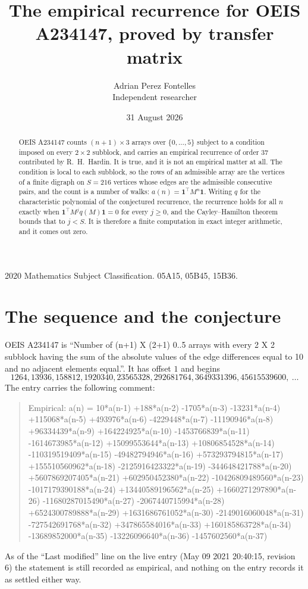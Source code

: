 \documentclass[11pt,a4paper]{article}
\title{The empirical recurrence for OEIS A234147, proved by transfer matrix}
\author{Adrian Perez Fontelles\\ \small Independent researcher}
\date{31 August 2026}
\theoremstyle{plain}
\theoremstyle{definition}
\begin{document}
\maketitle

\begin{abstract}
OEIS A234147 counts $(n+1)\times3$ arrays over $\{0,\dots,5\}$ subject to a condition imposed on
every $2\times2$ subblock, and carries an empirical recurrence of order $37$ contributed
by R.~H.~Hardin. It is true, and it is not an empirical matter at all. The condition is local
to each subblock, so the rows of an admissible array are the vertices of a finite digraph
on $S=216$ vertices whose edges are the admissible consecutive pairs, and the count is a
number of walks: $a(n)=\mathbf{1}^{\!\top}M^{n}\mathbf{1}$. Writing $q$
for the characteristic polynomial of the conjectured recurrence, the recurrence holds for all
$n$ exactly when $\mathbf{1}^{\!\top}M^{j}q(M)\mathbf{1}=0$ for every $j\ge0$, and the
Cayley--Hamilton theorem bounds that to $j<S$. It is therefore a finite computation in exact
integer arithmetic, and it comes out zero.
\end{abstract}

\noindent\small 2020 Mathematics Subject Classification. 05A15, 05B45, 15B36.\normalsize

\section{The sequence and the conjecture}

OEIS A234147 is ``Number of (n+1) X (2+1) 0..5 arrays with every 2 X 2 subblock having the sum of the absolute values of the edge differences equal to 10 and no adjacent elements equal.''. It has offset $1$ and begins
\[
1264, 13936, 158812, 1920340, 23565328, 292681764, 3649331396, 45615539600,\ \dots
\]
The entry carries the following comment:
\begin{quote}\small
Empirical: a(n) = 10*a(n-1) +188*a(n-2) -1705*a(n-3) -13231*a(n-4) +115068*a(n-5) +493976*a(n-6) -4229448*a(n-7) -11190946*a(n-8) +96334439*a(n-9) +164224925*a(n-10) -1453766839*a(n-11) -1614673985*a(n-12) +15099553644*a(n-13) +10806854528*a(n-14) -110319519409*a(n-15) -49482794946*a(n-16) +573293794815*a(n-17) +155510560962*a(n-18) -2125916423322*a(n-19) -344648421788*a(n-20) +5607869207405*a(n-21) +602950452380*a(n-22) -10426809489560*a(n-23) -1017179390188*a(n-24) +13440589196562*a(n-25) +1660271297890*a(n-26) -11680287015490*a(n-27) -2067440715994*a(n-28) +6524300789888*a(n-29) +1631686761052*a(n-30) -2149016060048*a(n-31) -727542691768*a(n-32) +347865584016*a(n-33) +160185863728*a(n-34) -13689852000*a(n-35) -13226096640*a(n-36) -1457602560*a(n-37)
\end{quote}
As of the ``Last modified'' line on the live entry (May 09 2021 20:40:15, revision 6) the statement is
still recorded as empirical, and nothing on the entry records it as settled either way.
\end{document}

